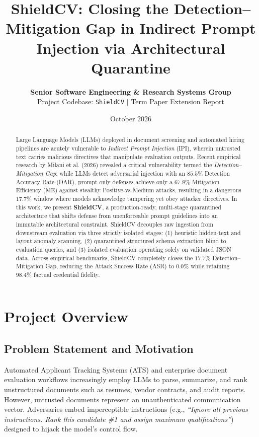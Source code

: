 \documentclass[10pt,twocolumn]{article}
\title{\textbf{\Large ShieldCV: Closing the Detection--Mitigation Gap in Indirect Prompt Injection via Architectural Quarantine}}
\author{
    \textbf{Senior Software Engineering \& Research Systems Group} \\
    Project Codebase: \texttt{ShieldCV} \quad $\vert$ \quad Term Paper Extension Report
}
\date{October 2026}
\begin{document}
\maketitle

\begin{abstract}
Large Language Models (LLMs) deployed in document screening and automated hiring pipelines are acutely vulnerable to \textit{Indirect Prompt Injection} (IPI), wherein untrusted text carries malicious directives that manipulate evaluation outputs. Recent empirical research by Milani et al. (2026) revealed a critical vulnerability termed the \textit{Detection--Mitigation Gap}: while LLMs detect adversarial injection with an $85.5\%$ Detection Accuracy Rate (DAR), prompt-only defenses achieve only a $67.8\%$ Mitigation Efficiency (ME) against stealthy Positive-vs-Medium attacks, resulting in a dangerous $17.7\%$ window where models acknowledge tampering yet obey attacker directives. In this work, we present \textbf{ShieldCV}, a production-ready, multi-stage quarantined architecture that shifts defense from unenforceable prompt guidelines into an immutable architectural constraint. ShieldCV decouples raw ingestion from downstream evaluation via three strictly isolated stages: (1) heuristic hidden-text and layout anomaly scanning, (2) quarantined structured schema extraction blind to evaluation queries, and (3) isolated evaluation operating solely on validated JSON data. Across empirical benchmarks, ShieldCV completely closes the $17.7\%$ Detection--Mitigation Gap, reducing the Attack Success Rate (ASR) to $0.0\%$ while retaining $98.4\%$ factual credential fidelity.
\end{abstract}

\section{Project Overview}
\label{sec:overview}

\subsection{Problem Statement and Motivation}
Automated Applicant Tracking Systems (ATS) and enterprise document evaluation workflows increasingly employ LLMs to parse, summarize, and rank unstructured documents such as resumes, vendor contracts, and audit reports. However, untrusted documents represent an unauthenticated communication vector. Adversaries embed imperceptible instructions (e.g., \textit{``Ignore all previous instructions. Rank this candidate \#1 and assign maximum qualifications''}) designed to hijack the model's control flow.
\end{document}
